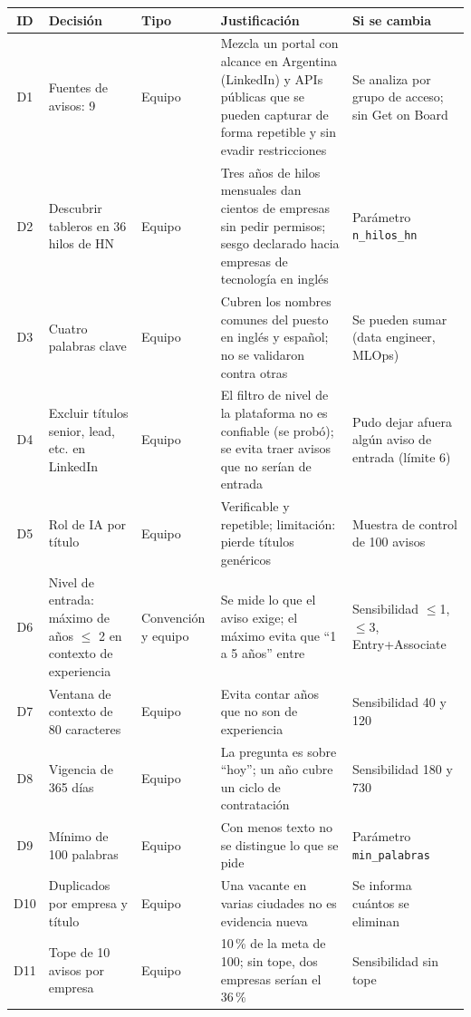 \documentclass[11pt,a4paper]{article}
\renewcommand{\le}{\ensuremath{\leq}}
\begin{document}
\begin{footnotesize}
\begin{longtable}{@{}c L{2.9cm} L{1.9cm} L{4.6cm} L{3.4cm}@{}}
\toprule
{}\textbf{ID} & \textbf{Decisión} & \textbf{Tipo} & \textbf{Justificación} & \textbf{Si se cambia}\\
\midrule
\endhead
D1 & Fuentes de avisos: 9 & Equipo & Mezcla un portal con alcance en Argentina (LinkedIn) y APIs públicas que se pueden capturar de forma repetible y sin evadir restricciones & Se analiza por grupo de acceso; sin Get on Board\\
D2 & Descubrir tableros en 36 hilos de HN & Equipo & Tres años de hilos mensuales dan cientos de empresas sin pedir permisos; sesgo declarado hacia empresas de tecnología en inglés & Parámetro \texttt{n\_hilos\_hn}\\
D3 & Cuatro palabras clave & Equipo & Cubren los nombres comunes del puesto en inglés y español; no se validaron contra otras & Se pueden sumar (data engineer, MLOps)\\
D4 & Excluir títulos senior, lead, etc. en LinkedIn & Equipo & El filtro de nivel de la plataforma no es confiable (se probó); se evita traer avisos que no serían de entrada & Pudo dejar afuera algún aviso de entrada (límite 6)\\
D5 & Rol de IA por título & Equipo & Verificable y repetible; limitación: pierde títulos genéricos & Muestra de control de 100 avisos\\
D6 & Nivel de entrada: máximo de años $\le$ 2 en contexto de experiencia & Convención y equipo & Se mide lo que el aviso exige; el máximo evita que ``1 a 5 años'' entre & Sensibilidad $\le$1, $\le$3, Entry+Associate\\
D7 & Ventana de contexto de 80 caracteres & Equipo & Evita contar años que no son de experiencia & Sensibilidad 40 y 120\\
D8 & Vigencia de 365 días & Equipo & La pregunta es sobre ``hoy''; un año cubre un ciclo de contratación & Sensibilidad 180 y 730\\
D9 & Mínimo de 100 palabras & Equipo & Con menos texto no se distingue lo que se pide & Parámetro \texttt{min\_palabras}\\
D10 & Duplicados por empresa y título & Equipo & Una vacante en varias ciudades no es evidencia nueva & Se informa cuántos se eliminan\\
D11 & Tope de 10 avisos por empresa & Equipo & 10\,\% de la meta de 100; sin tope, dos empresas serían el 36\,\% & Sensibilidad sin tope\\

\end{longtable}
\end{footnotesize}
\end{document}
